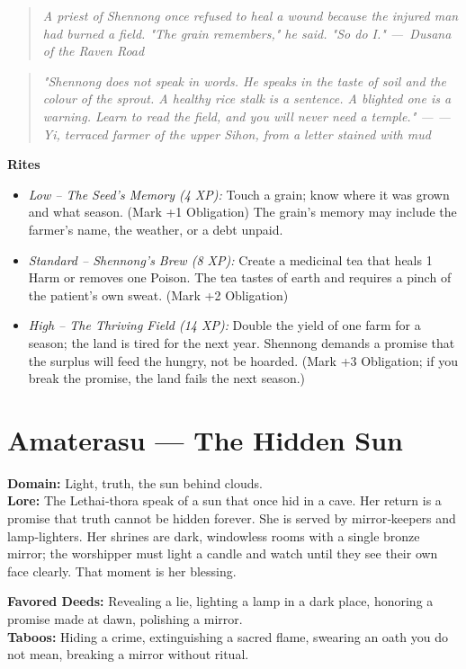 \documentclass[12pt]{book}
\newcommand{\dusana}[1]{%
    \begin{quote}\itshape #1 ---~Dusana of the Raven Road\end{quote}}
\newcommand{\letter}[2]{%
    \begin{quote}\small\itshape #1 \hfill --- #2\end{quote}}
\begin{document}
\vspace{0.5em}
\dusana{A priest of Shennong once refused to heal a wound because the injured man had burned a field. "The grain remembers," he said. "So do I."}

\letter{"Shennong does not speak in words. He speaks in the taste of soil and the colour of the sprout. A healthy rice stalk is a sentence. A blighted one is a warning. Learn to read the field, and you will never need a temple."}{--- Yi, terraced farmer of the upper Sihon, from a letter stained with mud}

\begin{infobox}
\textbf{Rites}
\begin{itemize}
    \item \textit{Low -- The Seed's Memory (4 XP):} Touch a grain; know where it was grown and what season. (Mark +1 Obligation) The grain's memory may include the farmer's name, the weather, or a debt unpaid.
    \item \textit{Standard -- Shennong's Brew (8 XP):} Create a medicinal tea that heals 1 Harm or removes one Poison. The tea tastes of earth and requires a pinch of the patient's own sweat. (Mark +2 Obligation)
    \item \textit{High -- The Thriving Field (14 XP):} Double the yield of one farm for a season; the land is tired for the next year. Shennong demands a promise that the surplus will feed the hungry, not be hoarded. (Mark +3 Obligation; if you break the promise, the land fails the next season.)
\end{itemize}
\end{infobox}

\section{Amaterasu --- The Hidden Sun}
\noindent\textbf{Domain:} Light, truth, the sun behind clouds.\\
\textbf{Lore:} The Lethai‑thora speak of a sun that once hid in a cave. Her return is a promise that truth cannot be hidden forever. She is served by mirror‑keepers and lamp‑lighters. Her shrines are dark, windowless rooms with a single bronze mirror; the worshipper must light a candle and watch until they see their own face clearly. That moment is her blessing.

\textbf{Favored Deeds:} Revealing a lie, lighting a lamp in a dark place, honoring a promise made at dawn, polishing a mirror.\\
\textbf{Taboos:} Hiding a crime, extinguishing a sacred flame, swearing an oath you do not mean, breaking a mirror without ritual.
\end{document}
